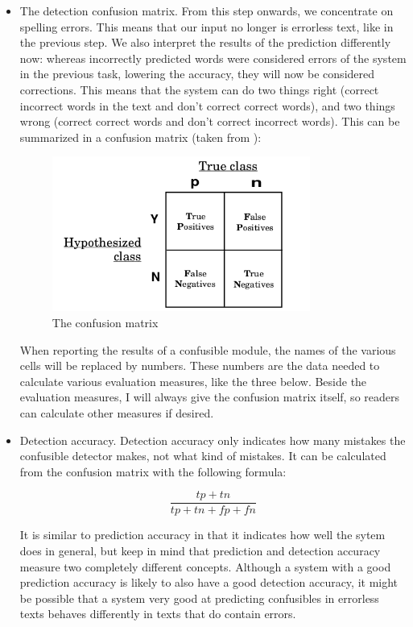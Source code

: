 \documentclass[12pt]{article}
\begin{document}
\begin{itemize}
\item The detection confusion matrix. From this step onwards, we concentrate on spelling errors. This means that our input no longer is errorless text, like in the previous step. We also interpret the results of the prediction differently now: whereas incorrectly predicted words were considered errors of the system in the previous task, lowering the accuracy, they will now be considered corrections. This means that the system can do two things right (correct incorrect words in the text and don't correct correct words), and two things wrong (correct correct words and don't correct incorrect words). This can be summarized in a confusion matrix (taken from \citet{fawcett04}):

\begin{figure}[htb]
\centering
\includegraphics[width=0.8\textwidth]{confusion_matrix.png}
\caption{The confusion matrix}
\label{fig:confusion}
\end{figure}

When reporting the results of a confusible module, the names of the various cells will be replaced by numbers. These numbers are the data needed to calculate various evaluation measures, like the three below. Beside the evaluation measures, I will always give the confusion matrix itself, so readers can calculate other measures if desired.

\item Detection accuracy. Detection accuracy only indicates how many mistakes the confusible detector makes, not what kind of mistakes. It can be calculated from the confusion matrix with the following formula:

\[
\frac{tp+tn}{tp+tn+fp+fn}
\]

It is similar to prediction accuracy in that it indicates how well the sytem does in general, but keep in mind that prediction and detection accuracy measure two completely different concepts. Although a system with a good prediction accuracy is likely to also have a good detection accuracy, it might be possible that a system very good at predicting confusibles in errorless texts behaves differently in texts that do contain errors.
 

\end{itemize}
\end{document}
